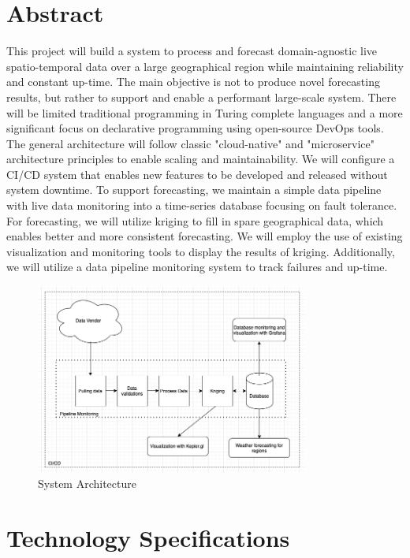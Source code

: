 \section{Abstract}
\noindent This project will build a system to process and forecast domain-agnostic live spatio-temporal data over a large geographical region while maintaining reliability and constant up-time. The main objective is not to produce novel forecasting results, but rather to support and enable a performant large-scale system. There will be limited traditional programming in Turing complete languages and a more significant focus on declarative programming using open-source DevOps tools. The general architecture will follow classic "cloud-native" and "microservice" architecture principles to enable scaling and maintainability. We will configure a CI/CD system that enables new features to be developed and released without system downtime. To support forecasting, we maintain a simple data pipeline with live data monitoring into a time-series database focusing on fault tolerance. For forecasting, we will utilize kriging to fill in spare geographical data, which enables better and more consistent forecasting. We will employ the use of existing visualization and monitoring tools to display the results of kriging. Additionally, we will utilize a data pipeline monitoring system to track failures and up-time. 



\begin{figure}[ht]
\centering
\includegraphics[angle=0,width=0.8\textwidth]{architecture.png}
\caption{System Architecture}
\end{figure}

\newpage %

\section{Technology Specifications}
\noindent 

